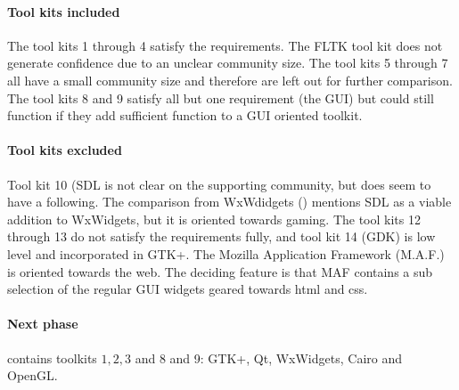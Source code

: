 \paragraph{Tool kits included} The tool kits 1 through 4 satisfy the
requirements.  The {\sf FLTK} tool kit does not generate confidence due to an
unclear community size.  The tool kits 5 through 7 all have a small community
size and therefore are left out for further comparison.  The tool kits 8 and 9
satisfy all but one requirement (the GUI) but could still function if they add
sufficient function to a GUI oriented toolkit. 

\paragraph{Tool kits excluded} Tool kit 10 ({\sf SDL} is not clear on the
supporting community, but does seem to have a following.  The comparison from
WxWdidgets (\cite{wxwidget:comparison}) mentions {\sf SDL} as a viable addition
to WxWidgets, but it is oriented towards gaming. The tool kits 12 through 13 do
not satisfy the requirements fully, and tool kit 14 (GDK) is low level and
incorporated in {\sf GTK+}.  The Mozilla Application Framework ({\sf M.A.F.})
is oriented towards the web. The deciding feature is that {\sf MAF} contains a
sub selection of the regular GUI widgets geared towards html and css.

\paragraph{Next phase} contains toolkits $1, 2, 3$ and 8 and 9: {\sf GTK+, Qt,
WxWidgets, Cairo and OpenGL}. 

